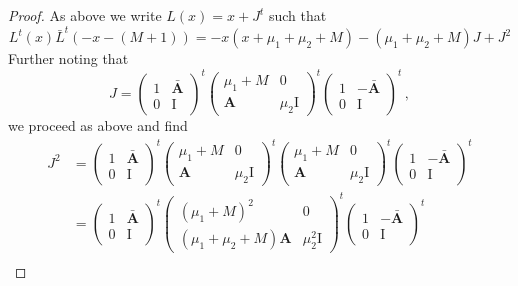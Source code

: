 \documentclass[11pt]{article}
\numberwithin{equation}{section}
\newcommand{\OA}{\mathbf{A}}
\newcommand{\OAD}{\mathbf{\bar{A}}}
\newcommand{\mmu}{\mu}
\newcommand{\ID}{\mathrm{I}}
\begin{document}
\begin{proof}
 As above we write $L(x)=x+J^t$ such that
 \begin{equation}
  L^t(x)\bar L^t(-x-(M+1))=-x(x+\mu_1+\mu_2+M)-(\mu_1+\mu_2+M)J +J^2
 \end{equation}
 Further noting that
\begin{equation}
		J=\left(\begin{array}{cc}
			1&\OAD\\
			0&\ID
		\end{array}\right)^t\left(\begin{array}{cc}
			\mmu_1+M&0\\
			\OA&\mmu_2\ID
		\end{array}\right)^t\left(\begin{array}{cc}
			1&-\OAD\\
			0&\ID
		\end{array}\right)^t\,,
	\end{equation}
	we proceed as above and find
	\begin{equation}
\begin{split}
		J^2&=\left(\begin{array}{cc}
			1&\OAD\\
			0&\ID
		\end{array}\right)^t\left(\begin{array}{cc}
			\mmu_1+M&0\\
			\OA&\mmu_2\ID
		\end{array}\right)^t\left(\begin{array}{cc}
			\mmu_1+M&0\\
			\OA&\mmu_2\ID
		\end{array}\right)^t\left(\begin{array}{cc}
			1&-\OAD\\
			0&\ID
		\end{array}\right)^t\\
        &=\left(\begin{array}{cc}
			1&\OAD\\
			0&\ID
		\end{array}\right)^t\left(\begin{array}{cc}
			(\mu_1+M)^2&0\\
			(\mu_1+\mu_2+M)\OA&\mu_2^2\ID
		\end{array}\right)^t\left(\begin{array}{cc}
			1&-\OAD\\
			0&\ID
		\end{array}\right)^t\\

\end{split}
\end{equation}
\end{proof}
\end{document}
